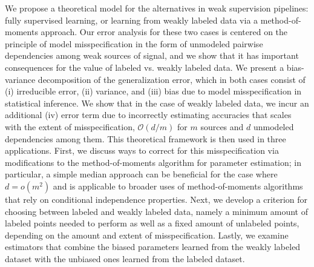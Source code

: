 We propose a theoretical model for the alternatives in weak supervision pipelines: fully supervised learning, or learning from weakly labeled data via a method-of-moments approach. Our error analysis for these two cases is centered on the principle of model misspecification in the form of unmodeled pairwise dependencies among weak sources of signal, and we show that it has important consequences for the value of labeled vs. weakly labeled data. We present a bias-variance decomposition of the generalization error, which in both cases consist of (i) irreducible error, (ii) variance, and (iii) bias due to model misspecification in statistical inference. We show that in the case of weakly labeled data, we incur an additional (iv) error term due to incorrectly estimating accuracies that scales with the extent of misspecification, $\mathcal{O}(d/m)$ for $m$ sources and $d$ unmodeled dependencies among them. %
This theoretical framework is then used in three applications. First, we discuss ways to correct for this misspecification via modifications to the method-of-moments algorithm for parameter estimation; in particular, a simple median approach can be beneficial for the case where $d = o(m^2)$ and is applicable to broader uses of method-of-moments algorithms that rely on conditional independence properties. Next, we develop a criterion for choosing between labeled and weakly labeled data, namely a minimum amount of labeled points needed to perform as well as a fixed amount of unlabeled points, depending on the amount and extent of misspecification. Lastly,
we examine estimators that combine the biased parameters learned from the weakly labeled dataset with the unbiased ones learned from the labeled dataset. %

